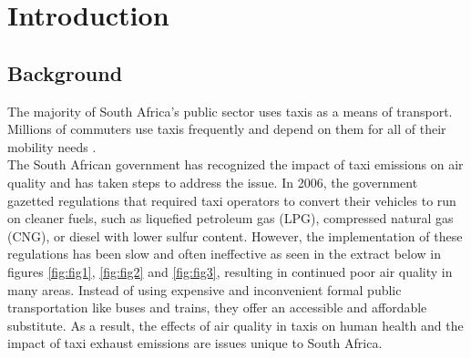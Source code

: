 \graphicspath{{introduction/fig/}}

\chapter{Introduction}
\label{chap:introduction}

\section{Background}
The majority of South Africa's public sector uses taxis as a means of transport. Millions of commuters use taxis frequently and depend on them for all of their mobility needs \cite{depttransport2023}.\\
The South African government has recognized the impact of taxi emissions on air quality and has taken steps to address the issue. In 2006, the government gazetted regulations that required taxi operators to convert their vehicles to run on cleaner fuels, such as liquefied petroleum gas (LPG), compressed natural gas (CNG), or diesel with lower sulfur content\cite{2007Comparison}. However, the implementation of these regulations has been slow and often ineffective as seen in the extract below in figures \ref{fig:fig1}, \ref{fig:fig2} and \ref{fig:fig3}, resulting in continued poor air quality in many areas.
Instead of using expensive and inconvenient formal public transportation like buses and trains, they offer an accessible and affordable substitute.
As a result, the effects of air quality in taxis on human health and the impact of taxi exhaust emissions are issues unique to South Africa.



